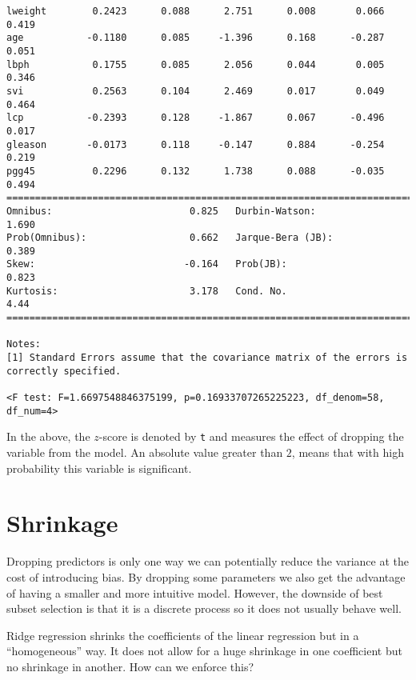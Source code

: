 \documentclass[11pt]{article}
\theoremstyle{definition}
\begin{document}
{\begin{verbatim}
lweight        0.2423      0.088      2.751      0.008       0.066       0.419
age           -0.1180      0.085     -1.396      0.168      -0.287       0.051
lbph           0.1755      0.085      2.056      0.044       0.005       0.346
svi            0.2563      0.104      2.469      0.017       0.049       0.464
lcp           -0.2393      0.128     -1.867      0.067      -0.496       0.017
gleason       -0.0173      0.118     -0.147      0.884      -0.254       0.219
pgg45          0.2296      0.132      1.738      0.088      -0.035       0.494
==============================================================================
Omnibus:                        0.825   Durbin-Watson:                   1.690
Prob(Omnibus):                  0.662   Jarque-Bera (JB):                0.389
Skew:                          -0.164   Prob(JB):                        0.823
Kurtosis:                       3.178   Cond. No.                         4.44
==============================================================================

Notes:
[1] Standard Errors assume that the covariance matrix of the errors is correctly specified.

<F test: F=1.6697548846375199, p=0.16933707265225223, df_denom=58, df_num=4>
\end{verbatim}
}

In the above, the $z$-score is denoted by \texttt t and measures the effect of
dropping the variable from the model. An absolute value greater than $2$, means
that with high probability this variable is significant.
 
\section{Shrinkage}
Dropping predictors is only one way we can potentially reduce the variance at
the cost of introducing bias. By dropping some parameters we also get the
advantage of having a smaller and more intuitive model. However, the downside of
best subset selection is that it is a discrete process so it does not usually
behave well.

Ridge regression shrinks the coefficients of the linear regression but in a
``homogeneous'' way. It does not allow for a huge shrinkage in one coefficient
but no shrinkage in another. How can we enforce this?
\end{document}
